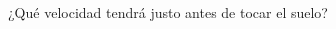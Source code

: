 ¿Qué velocidad tendrá justo antes de tocar el suelo?


\begin{solutionbox}{1.5cm}

\end{solutionbox}

